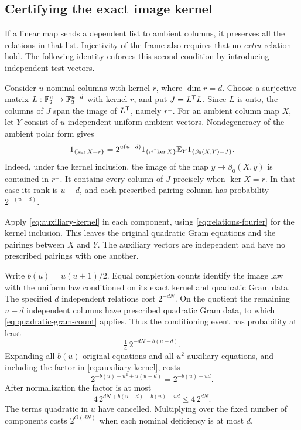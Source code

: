 \subsection{Certifying the exact image kernel}

If a linear map sends a dependent list to ambient columns, it preserves
all the relations in that list. Injectivity of the frame also requires
that no \emph{extra} relation hold. The following identity enforces this
second condition by introducing independent test vectors.

Consider \(u\) nominal columns with kernel \(r\), where \(\dim r=d\).
Choose a surjective matrix \(L:\mathbb F_2^u\to\mathbb F_2^{u-d}\) with kernel \(r\),
and put \(J=L^{\mathsf T} L\). Since \(L\) is onto, the columns of \(J\) span the image of
\(L^{\mathsf T}\), namely \(r^\perp\).
For an ambient column map \(X\), let \(Y\) consist of \(u\) independent
uniform ambient vectors. Nondegeneracy of the ambient polar form gives
\begin{equation}\label{eq:auxiliary-kernel}
 1_{\{\ker X=r\}}
 =2^{u(u-d)}1_{\{r\subseteq\ker X\}}
   \mathbb E_Y1_{\{\beta_0(X,Y)=J\}}.
\end{equation}
Indeed, under the kernel inclusion, the image of the map
\(y\mapsto\beta_0(X,y)\) is contained in \(r^\perp\).
It contains every column of \(J\) precisely when \(\ker X=r\).
In that case its rank is \(u-d\), and each prescribed pairing column
has probability \(2^{-(u-d)}\).

Apply \eqref{eq:auxiliary-kernel} in each component, using
\eqref{eq:relations-fourier} for the kernel inclusion. This leaves the
original quadratic Gram equations and the pairings between \(X\) and
\(Y\). The auxiliary vectors are independent and have no prescribed
pairings with one another.

Write \(b(u)=u(u+1)/2\). Equal completion counts identify the image law with the uniform law
conditioned on its exact kernel and quadratic Gram data. The specified
\(d\) independent relations cost \(2^{-dN}\). On the quotient the
remaining \(u-d\) independent columns have prescribed quadratic Gram
data, to which \eqref{eq:quadratic-gram-count} applies. Thus the
conditioning event has probability at least
\[
 \tfrac14\,2^{-dN-b(u-d)}.
\]
Expanding all \(b(u)\) original equations and all \(u^2\) auxiliary
equations, and including the factor in \eqref{eq:auxiliary-kernel}, costs
\[
 2^{-b(u)-u^2+u(u-d)}=2^{-b(u)-ud}.
\]
After normalization the factor is at most
\[
 4\,2^{dN+b(u-d)-b(u)-ud}\le4\,2^{dN}.
\]
The terms quadratic in \(u\) have cancelled. Multiplying over the
fixed number of components costs \(2^{O(dN)}\) when each nominal
deficiency is at most \(d\).

